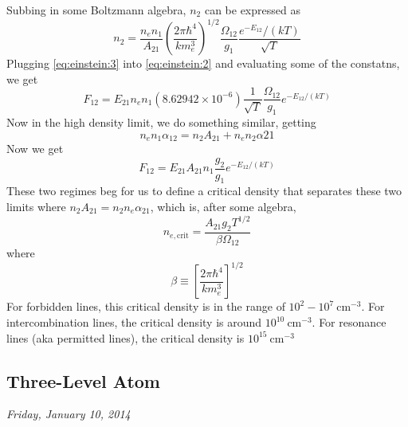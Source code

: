 \documentclass[10pt]{article}
\numberwithin{equation}{section}
\begin{document}
Subbing in some Boltzmann algebra, $n_2$ can be expressed as
\begin{equation}
  \label{eq:einstein:3} n_2 = \frac{n_en_1}{A_{21}} \left( \frac{2\pi \hbar^4} {k m_e^3}\right)^{1/2} \frac{\Omega_{12}}{g_1} \frac{e^{-E_12}/(kT)}{\sqrt{T}}
\end{equation}
Plugging \eqref{eq:einstein:3} into \eqref{eq:einstein:2} and evaluating some of the constatns, we get
\begin{equation}
  \label{eq:einstein:4} F_{12} = E_{21} n_e n_1 \left(8.62942\times 10^{-6}\right) \frac{1}{\sqrt{T}} \frac{\Omega_{12}}{g_1}e^{-E_{12}/(kT)}
\end{equation}
Now in the high density limit, we do something similar, getting
\begin{equation}
  \label{eq:einstein:5} n_e n_1 \alpha_{12} = n_2 A_{21} + n_e n_2 \alpha{21}
\end{equation}
Now we get
\begin{equation}
  \label{eq:einstein:6} F_{12} = E_{21} A_{21} n_1 \frac{g_2}{g_1} e^{-E_{12} / (kT)}
\end{equation}
These two regimes beg for us to define a critical density that separates these two limits where $n_2A_{21} = n_2n_e \alpha_{21}$, which is, after some algebra,
\begin{equation}
  \label{eq:einstein:7} \boxed{n_{e, \mathrm{crit}} = \frac{A_{21}g_2 T^{1/2}} {\beta \Omega_{12}}}
\end{equation}
where 
\begin{equation}
  \label{eq:einstein:8} \beta \equiv \left[\frac{2\pi \hbar^4}{k m_e^3}\right]^{1/2}
\end{equation}
For forbidden lines, this critical density is in the range of $10^2-10^7\ \mathrm{cm^{-3}}$. For intercombination lines, the critical density is around $10^10\ \mathrm{cm^{-3}}$. For resonance lines (aka permitted lines), the critical density is $10^{15}\ \mathrm{cm^{-3}}$

\subsection{Three-Level Atom} %
\label{sub:three_level_atom}
\textit{Friday, January 10, 2014}
\end{document}

